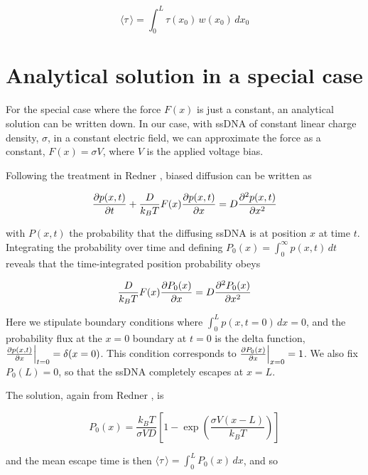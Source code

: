 \begin{equation}
\langle \tau \, \rangle = \int_{0}^{L} \tau(x_0) \, w(x_0) \,dx_0
\label{eqn:mean_first_passage_sol}
\end{equation}

\section{Analytical solution in a special case}

For the special case where the force $F(x)$ is just a constant, an analytical solution can be written down.  In our case, with ssDNA of constant linear charge density, $\sigma$, in a constant electric field, we can approximate the force as a constant, $F(x) = \sigma V$, where $V$ is the applied voltage bias.

Following the treatment in Redner \citep{Redner2001}, biased diffusion can be written as

\begin{equation}
\frac{\partial p(x,t)}{\partial t} + \frac{D}{k_B T} F(x) \frac{\partial p(x,t)}{\partial x} = D \frac{\partial^2 p(x,t)}{\partial x^2}
\label{eqn:biased_diffusion}
\end{equation}

\noindent
with $P(x,t)$ the probability that the diffusing ssDNA is at position $x$ at time $t$.  Integrating the probability over time and defining $P_0(x) = \int_{0}^{\infty} p(x,t) \,dt$ reveals that the time-integrated position probability obeys

\begin{equation}
\frac{D}{k_B T} F(x) \frac{\partial P_0(x)}{\partial x} = D \frac{\partial^2 P_0(x)}{\partial x^2}
\label{eqn:biased_diffusion}
\end{equation}

Here we stipulate boundary conditions where $\int_{0}^{L} p(x,t=0) \,dx = 0$, and the probability flux at the $x=0$ boundary at $t=0$ is the delta function, $\frac{\partial p(x,t)}{\partial x} \Bigr|_{t=0} = \delta (x=0)$.  This condition corresponds to $\frac{\partial P_0(x)}{\partial x} \Bigr|_{x=0} = 1$.  We also fix $P_0(L)=0$, so that the ssDNA completely escapes at $x=L$.

The solution, again from Redner \citep{Redner2001}, is

\begin{equation}
P_0(x) = \frac{k_B T}{\sigma V D} \left[ 1 - \exp{ \left( \frac{\sigma V (x-L)}{k_B T} \right) } \right]
\label{eqn:biased_diffusion_solution}
\end{equation}

\noindent
and the mean escape time is then $\langle \tau \, \rangle = \int_{0}^{L} P_0(x) \,dx$, and so

